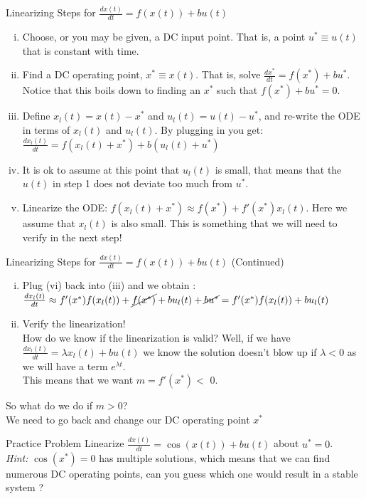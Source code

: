 \begin{frame}{Linearizing Steps for $\frac{dx(t)}{dt} = f(x(t)) + bu(t)$}
\begin{enumerate}[(i)]
\item Choose, or you may be given, a DC input point. That is, a point $u^* \equiv u(t)$ that is constant with time.\pause \\
\item Find a DC operating point, $x^* \equiv x(t)$. That is, solve $\frac{dx^*}{dt} = f(x^*) + bu^*$. Notice that this boils down to finding an $x^*$ such that $f(x^*) + bu^* = 0 $. \pause \\
\item Define $x_l(t) = x(t) - x^*$ and $u_l(t) = u(t) - u^*$, and re-write the ODE in terms of $ x_l(t)$ and $ u_l(t)$. By plugging in you get: $\frac{dx_l(t)}{dt} = f(x_l(t) + x^*) + b(u_l(t)+ u^*)$ \pause \\
\item It is ok to assume at this point that $u_l(t)$ is small, that means that the $u(t)$ in step 1 does not deviate too much from $u^*$.\pause \\
\item Linearize the ODE: $f(x_l(t) + x^*) \approx f(x^*) + f'(x^*)x_l(t)$. Here we assume that $x_l(t)$ is also small. This is something that we will need to verify in the next step!
\end{enumerate}
\end{frame}
\begin{frame}{Linearizing Steps for $\frac{dx(t)}{dt} = f(x(t)) + bu(t)$ (Continued)}
\begin{enumerate}[(vi)]
\item Plug (vi) back into  (iii) and we obtain : $\frac{dx_l(t)}{dt} \approx f'(x^*)f(x_l(t)) + \cancel{f(x^*)} + bu_l(t)+ \cancel{bu^*} = f'(x^*)f(x_l(t))+ bu_l(t)$
\item Verify the linearization! \\
How do we know if the linearization is valid? \pause Well, if we have $\frac{dx_l(t)}{dt} = \lambda x_l(t) + bu(t)$ we know the solution doesn't blow up if $\lambda < 0$ as we will have a term $e^{\lambda t}$.
\\ This means that we want $m = f'(x^*) <$  0. 
\end{enumerate} \pause
So what do we do if $m>0 $? \pause \\
We need to go back and change our DC operating point $x^*$
\end{frame}
\begin{frame}{Practice Problem}
Linearize $\frac{dx(t)}{dt} = \cos(x(t)) + bu(t)$ about $u^* = 0$. \pause \\
\textit{Hint:} $\cos(x^*) = 0$ has multiple solutions, which means that we can find numerous DC operating points, can you guess which one would result in a stable system ? 
\end{frame}
